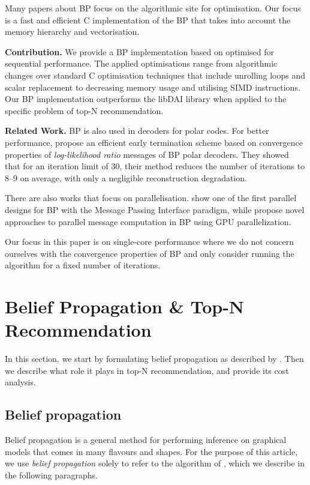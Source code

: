 \documentclass[final,letterpaper]{article}
\newcommand{\mypar}[1]{{\bf #1.}}
\begin{document}
Many papers about BP focus on the algorithmic site for optimisation. Our focus is a fast and efficient C implementation of the BP that takes into account the memory hierarchy and vectorisation.

\mypar{Contribution}
We provide a BP implementation based on \citet{top-n-recommendation} optimised for sequential performance. The applied optimisations range from algorithmic changes over standard C optimisation techniques that include unrolling loops and scalar replacement to decreasing memory usage and utilising SIMD instructions. Our BP implementation outperforms the libDAI library \cite{libdai} when applied to the specific problem of top-N recommendation. 

\mypar{Related Work}
BP is also used in decoders for polar codes. For better performance, \citet{related1} propose an efficient early termination scheme based on convergence properties of \emph{log-likelihood ratio} messages of BP polar decoders. They showed that for an iteration limit of 30, their method reduces the number of iterations to 8--9 on average, with only a negligible reconstruction degradation.

There are also works that focus on parallelisation. \citet{related2} show one of the first parallel designs for BP with the Message Passing Interface paradigm, while \citet{related3} propose novel approaches to parallel message computation in BP using GPU parallelization.

Our focus in this paper is on single-core performance where we do not concern ourselves with the convergence properties of BP and only consider running the algorithm for a fixed number of iterations.

\section{Belief Propagation \& Top-N Recommendation}\label{sec:background}

In this section, we start by formulating belief propagation as described by \citet{top-n-recommendation}. Then we describe what role it plays in top-N
recommendation, and provide its cost analysis.

\subsection{Belief propagation} \label{subsec:bp}

Belief propagation is a general method for performing inference on
graphical models that comes in many flavours and shapes. For the purpose of
this article, we use \emph{belief propagation} solely to refer to the algorithm
of \citet[Section 2.1]{top-n-recommendation}, which we describe in the
following paragraphs.
\end{document}
